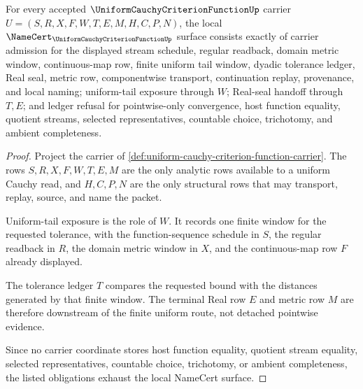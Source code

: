 \begin{theorem}
\label{thm:uniform-cauchy-criterion-function-obligations}
For every accepted $\UniformCauchyCriterionFunctionUp$ carrier $U=(S,R,X,F,W,T,E,M,H,C,P,N)$, the local $\NameCert_{\UniformCauchyCriterionFunctionUp}$ surface consists exactly of carrier admission for the displayed stream schedule, regular readback, domain metric window, continuous-map row, finite uniform tail window, dyadic tolerance ledger, Real seal, metric row, componentwise transport, continuation replay, provenance, and local naming; uniform-tail exposure through $W$; Real-seal handoff through $T,E$; and ledger refusal for pointwise-only convergence, host function equality, quotient streams, selected representatives, countable choice, trichotomy, and ambient completeness.
\end{theorem}
\begin{proof}
Project the carrier of \autoref{def:uniform-cauchy-criterion-function-carrier}. The rows $S,R,X,F,W,T,E,M$ are the only analytic rows available to a uniform Cauchy read, and $H,C,P,N$ are the only structural rows that may transport, replay, source, and name the packet.

Uniform-tail exposure is the role of $W$. It records one finite window for the requested tolerance, with the function-sequence schedule in $S$, the regular readback in $R$, the domain metric window in $X$, and the continuous-map row $F$ already displayed.

The tolerance ledger $T$ compares the requested bound with the distances generated by that finite window. The terminal Real row $E$ and metric row $M$ are therefore downstream of the finite uniform route, not detached pointwise evidence.

Since no carrier coordinate stores host function equality, quotient stream equality, selected representatives, countable choice, trichotomy, or ambient completeness, the listed obligations exhaust the local NameCert surface.
\end{proof}

